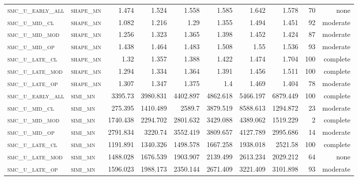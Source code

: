 \begin{landscape}
\begin{center}
\begin{footnotesize}
\begin{longtable}{llrrrrr|rrr}
\textsc{smc\_u\_early\_all} & \textsc{shape\_mn }   & 1.474    & 1.524    & 1.558    & 1.585    & 1.642    & 1.578         & 70            & none        \\
\textsc{smc\_u\_mid\_cl   } & \textsc{shape\_mn }   & 1.082    & 1.216    & 1.29     & 1.355    & 1.494    & 1.451         & 92            & moderate        \\
\textsc{smc\_u\_mid\_mod  } & \textsc{shape\_mn }   & 1.256    & 1.323    & 1.365    & 1.398    & 1.452    & 1.424         & 87            & moderate        \\
\textsc{smc\_u\_mid\_op   } & \textsc{shape\_mn }   & 1.438    & 1.464    & 1.483    & 1.508    & 1.55     & 1.536         & 93            & moderate        \\
\textsc{smc\_u\_late\_cl  } & \textsc{shape\_mn }   & 1.32     & 1.357    & 1.388    & 1.422    & 1.474    & 1.704         & 100           & complete        \\
\textsc{smc\_u\_late\_mod } & \textsc{shape\_mn }   & 1.294    & 1.334    & 1.364    & 1.391    & 1.456    & 1.511         & 100           & complete        \\
\textsc{smc\_u\_late\_op  } & \textsc{shape\_mn }   & 1.307    & 1.347    & 1.375    & 1.4      & 1.469    & 1.404         & 78            & moderate        \\
\textsc{smc\_u\_early\_all} & \textsc{simi\_mn  }   & 3395.73  & 3980.831 & 4402.897 & 4862.618 & 5466.197 & 6879.449      & 100           & complete        \\
\textsc{smc\_u\_mid\_cl   } & \textsc{simi\_mn  }   & 275.395  & 1410.489 & 2589.7   & 3879.519 & 8588.613 & 1294.872      & 23            & moderate        \\
\textsc{smc\_u\_mid\_mod  } & \textsc{simi\_mn  }   & 1740.438 & 2294.702 & 2801.632 & 3429.088 & 4389.062 & 1519.229      & 2             & complete        \\
\textsc{smc\_u\_mid\_op   } & \textsc{simi\_mn  }   & 2791.834 & 3220.74  & 3552.419 & 3809.657 & 4127.789 & 2995.686      & 14            & moderate        \\
\textsc{smc\_u\_late\_cl  } & \textsc{simi\_mn  }   & 1191.891 & 1340.326 & 1498.578 & 1667.258 & 1938.018 & 2521.58       & 100           & complete        \\
\textsc{smc\_u\_late\_mod } & \textsc{simi\_mn  }   & 1488.028 & 1676.539 & 1903.907 & 2139.499 & 2613.234 & 2029.212      & 64            & none        \\
\textsc{smc\_u\_late\_op  } & \textsc{simi\_mn  }   & 1596.023 & 1988.173 & 2350.144 & 2671.409 & 3221.409 & 3101.898      & 93            & moderate        \\

\end{longtable}
\end{footnotesize}
\end{center}
\end{landscape}

